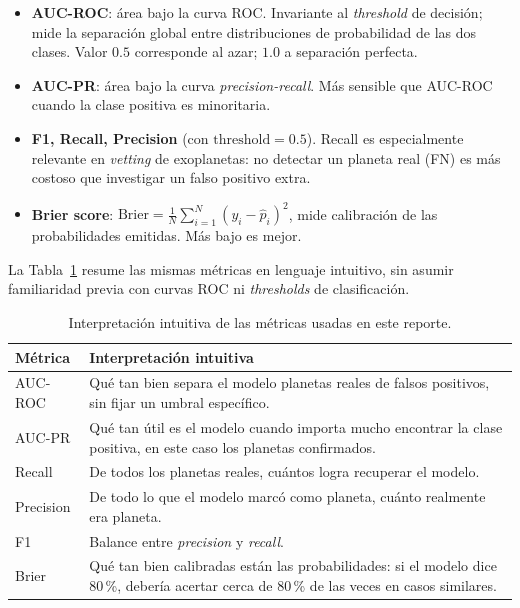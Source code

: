 \documentclass[11pt,a4paper]{article}
\begin{document}
\begin{itemize}
  \item \textbf{AUC-ROC}: área bajo la curva ROC. Invariante al
    \textit{threshold} de decisión; mide la separación global entre
    distribuciones de probabilidad de las dos clases. Valor $0.5$
    corresponde al azar; $1.0$ a separación perfecta.
  \item \textbf{AUC-PR}: área bajo la curva
    \textit{precision-recall}. Más sensible que AUC-ROC cuando la
    clase positiva es minoritaria.
  \item \textbf{F1, Recall, Precision} (con $\text{threshold} = 0.5$).
    Recall es especialmente relevante en \textit{vetting} de
    exoplanetas: no detectar un planeta real (FN) es más costoso que
    investigar un falso positivo extra.
  \item \textbf{Brier score}:
    $\mathrm{Brier} = \frac{1}{N}\sum_{i=1}^{N}(y_i - \hat{p}_i)^2$,
    mide calibración de las probabilidades emitidas. Más bajo es
    mejor.
\end{itemize}

La Tabla~\ref{tab:metric-intuition} resume las mismas métricas en
lenguaje intuitivo, sin asumir familiaridad previa con curvas ROC ni
\textit{thresholds} de clasificación.

\begin{table}[H]
\centering
\caption{Interpretación intuitiva de las métricas usadas en este
reporte.}
\label{tab:metric-intuition}
\renewcommand{\arraystretch}{1.2}
\begin{tabular}{p{} p{}}
\toprule
\textbf{Métrica} & \textbf{Interpretación intuitiva} \\
\midrule
AUC-ROC   & Qué tan bien separa el modelo planetas reales de falsos
            positivos, sin fijar un umbral específico. \\
AUC-PR    & Qué tan útil es el modelo cuando importa mucho encontrar
            la clase positiva, en este caso los planetas confirmados. \\
Recall    & De todos los planetas reales, cuántos logra recuperar el
            modelo. \\
Precision & De todo lo que el modelo marcó como planeta, cuánto
            realmente era planeta. \\
F1        & Balance entre \textit{precision} y \textit{recall}. \\
Brier     & Qué tan bien calibradas están las probabilidades: si el
            modelo dice 80\,\%, debería acertar cerca de 80\,\% de las
            veces en casos similares. \\
\bottomrule
\end{tabular}
\end{table}
\end{document}

